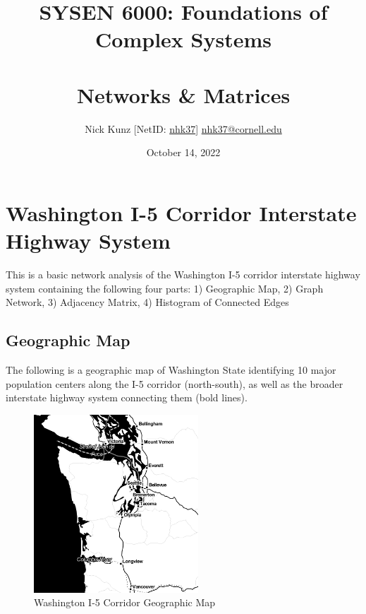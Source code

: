 \documentclass{article}
\begin{document}
\title{SYSEN 6000: Foundations of Complex Systems\\~\\
    \Large Networks \& Matrices
}
\author{
    Nick Kunz [NetID: \url{nhk37}] \hyperlink{nhk37@cornell.edu}{nhk37@cornell.edu}}
\date{October 14, 2022}
\maketitle
\thispagestyle{fancy}

\section*{Washington I-5 Corridor Interstate Highway System}
This is a basic network analysis of the Washington I-5 corridor interstate highway system containing the following four parts: 1) Geographic Map, 2) Graph Network, 3) Adjacency Matrix, 4) Histogram of Connected Edges

\subsection*{Geographic Map}
The following is a geographic map of Washington State identifying 10 major population centers along the I-5 corridor (north-south), as well as the broader interstate highway system connecting them (bold lines).
    \begin{figure}[h]
        \centering
        \includegraphics[width=0.55\textwidth]{pnw_map.png}
        \caption{Washington I-5 Corridor Geographic Map \cite{folium}}
        \label{fig:geomap}
    \end{figure}

\newpage
\end{document}
